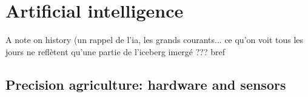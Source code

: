 


\clearpage 


\section{Artificial intelligence}

A note on history (un rappel de l'ia, les grands courants... ce qu'on voit tous les jours ne reflètent qu'une partie de l'iceberg imergé ??? bref

\subsection{Precision agriculture: hardware and sensors}

